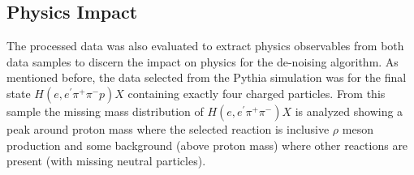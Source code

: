 \subsection{Physics Impact}

The processed data was also evaluated to extract physics observables from both data samples to discern the impact on physics for the de-noising algorithm. As mentioned before, the data selected from the Pythia simulation was for the final state $H(e,e^\prime\pi^+\pi^-p)X$ containing exactly four charged particles. From this sample the missing mass distribution of $H(e,e^\prime\pi^+\pi^-)X$ is analyzed showing a peak around proton mass where the selected reaction is inclusive $\rho$ meson production and some background (above proton mass) where other reactions are present (with missing neutral particles).

